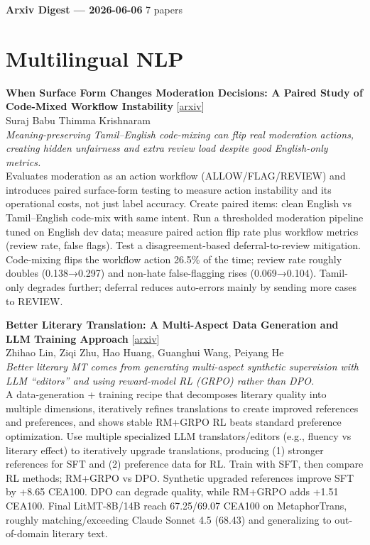 \documentclass[12pt,letterpaper]{article}
\begin{document}
{\footnotesize\textbf{Arxiv Digest --- 2026-06-06} \hfill 7 papers}

\smallskip

\section*{Multilingual NLP}

{\small\textbf{When Surface Form Changes Moderation Decisions: A Paired Study of Code-Mixed Workflow Instability}} {\scriptsize[\href{https://arxiv.org/abs/2606.05654}{arxiv}]}\\
{\scriptsize Suraj Babu Thimma Krishnaram}\\

{\small\textit{Meaning-preserving Tamil--English code-mixing can flip real moderation actions, creating hidden unfairness and extra review load despite good English-only metrics.}}\\[1pt]
{\footnotesize Evaluates moderation as an action workflow (ALLOW/FLAG/REVIEW) and introduces paired surface-form testing to measure action instability and its operational costs, not just label accuracy. Create paired items: clean English vs Tamil--English code-mix with same intent. Run a thresholded moderation pipeline tuned on English dev data; measure paired action flip rate plus workflow metrics (review rate, false flags). Test a disagreement-based deferral-to-review mitigation. Code-mixing flips the workflow action 26.5\% of the time; review rate roughly doubles (0.138→0.297) and non-hate false-flagging rises (0.069→0.104). Tamil-only degrades further; deferral reduces auto-errors mainly by sending more cases to REVIEW.}

\medskip

{\small\textbf{Better Literary Translation: A Multi-Aspect Data Generation and LLM Training Approach}} {\scriptsize[\href{https://arxiv.org/abs/2606.05924}{arxiv}]}\\
{\scriptsize Zhihao Lin, Ziqi Zhu, Hao Huang, Guanghui Wang, Peiyang He}\\

{\small\textit{Better literary MT comes from generating multi-aspect synthetic supervision with LLM ``editors'' and using reward-model RL (GRPO) rather than DPO.}}\\[1pt]
{\footnotesize A data-generation + training recipe that decomposes literary quality into multiple dimensions, iteratively refines translations to create improved references and preferences, and shows stable RM+GRPO RL beats standard preference optimization. Use multiple specialized LLM translators/editors (e.g., fluency vs literary effect) to iteratively upgrade translations, producing (1) stronger references for SFT and (2) preference data for RL. Train with SFT, then compare RL methods; RM+GRPO vs DPO. Synthetic upgraded references improve SFT by +8.65 CEA100. DPO can degrade quality, while RM+GRPO adds +1.51 CEA100. Final LitMT-8B/14B reach 67.25/69.07 CEA100 on MetaphorTrans, roughly matching/exceeding Claude Sonnet 4.5 (68.43) and generalizing to out-of-domain literary text.}
\end{document}
